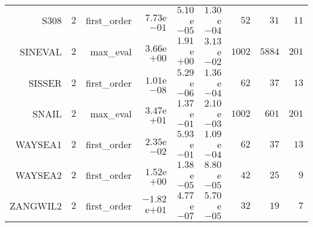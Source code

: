\begin{longtable}{rrrrrrrrr}
S308 & \(     2\) & first\_order & \( 7.73\)e\(-01\) & \( 5.10\)e\(-05\) & \( 1.30\)e\(-04\) & \(    52\) & \(    31\) & \(    11\) \\
SINEVAL & \(     2\) & max\_eval & \( 3.66\)e\(+00\) & \( 1.91\)e\(+00\) & \( 3.13\)e\(-02\) & \(  1002\) & \(  5884\) & \(   201\) \\
SISSER & \(     2\) & first\_order & \( 1.01\)e\(-08\) & \( 5.29\)e\(-06\) & \( 1.36\)e\(-04\) & \(    62\) & \(    37\) & \(    13\) \\
SNAIL & \(     2\) & max\_eval & \( 3.47\)e\(+01\) & \( 1.37\)e\(-01\) & \( 2.10\)e\(-03\) & \(  1002\) & \(   601\) & \(   201\) \\
WAYSEA1 & \(     2\) & first\_order & \( 2.35\)e\(-02\) & \( 5.93\)e\(-01\) & \( 1.09\)e\(-04\) & \(    62\) & \(    37\) & \(    13\) \\
WAYSEA2 & \(     2\) & first\_order & \( 1.52\)e\(+00\) & \( 1.38\)e\(-05\) & \( 8.80\)e\(-05\) & \(    42\) & \(    25\) & \(     9\) \\
ZANGWIL2 & \(     2\) & first\_order & \(-1.82\)e\(+01\) & \( 4.77\)e\(-07\) & \( 5.70\)e\(-05\) & \(    32\) & \(    19\) & \(     7\) \\\hline
\end{longtable}
